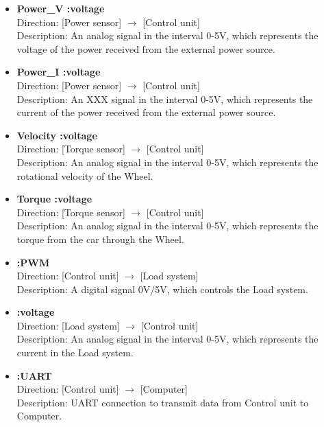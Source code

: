 \begin{itemize}
	\item \textbf{Power\_V :voltage}\\
		Direction: [Power sensor] $\rightarrow$ [Control unit]\\
		Description: An analog signal in the interval 0-5V, which represents the voltage of the power received from the external power source.
	\item \textbf{Power\_I :voltage}\\
		Direction: [Power sensor] $\rightarrow$ [Control unit]\\
		Description: An XXX  signal in the interval 0-5V, which represents the current of the power received from the external power source.
	\item \textbf{Velocity :voltage}\\
		Direction: [Torque sensor] $\rightarrow$ [Control unit]\\
		Description: An analog signal in the interval 0-5V, which represents the rotational velocity of the Wheel.
	\item \textbf{Torque :voltage}\\
		Direction: [Torque sensor] $\rightarrow$ [Control unit]\\
		Description: An analog signal in the interval 0-5V, which represents the torque from the car through the Wheel.
	\item \textbf{:PWM}\\
		Direction: [Control unit] $\rightarrow$ [Load system]\\
		Description: A digital signal 0V/5V, which controls the Load system.
	\item \textbf{:voltage}\\
		Direction: [Load system] $\rightarrow$ [Control unit]\\
		Description: An analog signal in the interval 0-5V, which represents the current in the Load system.
	\item \textbf{:UART}\\
		Direction: [Control unit] $\rightarrow$ [Computer]\\
		Description: UART connection to transmit data from Control unit to Computer.
\end{itemize}